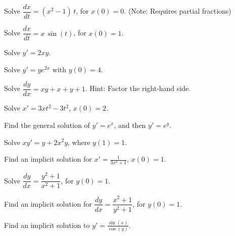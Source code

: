 \begin{exercise}
Solve $\dfrac{dx}{dt} = (x^2-1)\,t$, for $x(0) = 0$. (Note: Requires partial fractions)
\end{exercise}

\begin{exercise}
Solve $\dfrac{dx}{dt} = x\,\sin(t)$, for $x(0) = 1$.
\end{exercise}

\begin{exercise}\ansMark%
Solve $y'=2xy$.
\end{exercise}

\begin{exercise}
Solve $y' = ye^{2x}$ with $y(0) = 4$. 
\end{exercise}

\begin{exercise}
Solve $\dfrac{dy}{dx} = xy+x+y+1$.  Hint: Factor the right-hand side.
\end{exercise}

\begin{exercise}\ansMark%
Solve $x'=3xt^2-3t^2$, $x(0)=2$.
\end{exercise}

\begin{exercise}
Find the general solution of
$y' = e^x$,  and then $y' = e^y$.
\end{exercise}

\begin{exercise}
Solve $xy' = y + 2x^2 y$, where $y(1) = 1$.
\end{exercise}

\begin{exercise}\ansMark%
Find an implicit solution for
$x'=\frac{1}{3x^2+1}$, $x(0)=1$.
\end{exercise}

\begin{exercise}
Solve $\dfrac{dy}{dx} = \dfrac{y^2+1}{x^2+1}$, for $y(0) = 1$.
\end{exercise}

\begin{exercise}
Find an implicit solution for
$\dfrac{dy}{dx} = \dfrac{x^2+1}{y^2+1}$, for $y(0) = 1$.
\end{exercise}

\begin{exercise}\ansMark%
Find an implicit solution to $y' = \frac{\sin(x)}{\cos(y)}$.
\end{exercise}

